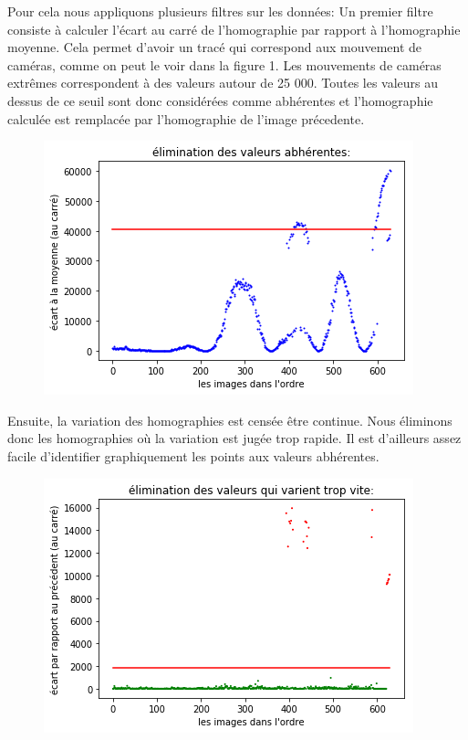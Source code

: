\documentclass[a4paper]{article}
\begin{document}
Pour cela nous appliquons plusieurs filtres sur les données:
Un premier filtre consiste à calculer l'écart au carré de l'homographie par rapport à l'homographie moyenne. Cela permet d'avoir un tracé qui correspond aux mouvement de caméras, comme on peut le voir dans la figure 1. Les mouvements de caméras extrêmes correspondent à des valeurs autour de 25 000. Toutes les valeurs au dessus de ce seuil sont donc considérées comme abhérentes et l'homographie calculée est remplacée par l'homographie de l'image précedente.

\begin{figure}[h!]
\centering
\includegraphics[width=\textwidth]{valeurs_abherentes.png}
\end{figure}

Ensuite, la variation des homographies est censée être continue. Nous éliminons donc les homographies où la variation est jugée trop rapide. Il est d'ailleurs assez facile d'identifier graphiquement les points aux valeurs abhérentes.

\begin{figure}[h!]
\centering
\includegraphics[width=\textwidth]{valeurs_abherentes_2.png}
\end{figure}
\end{document}
